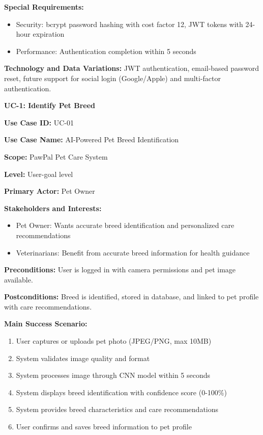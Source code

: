 \textbf{Special Requirements:}
\begin{itemize}
    \item Security: bcrypt password hashing with cost factor 12, JWT tokens with 24-hour expiration
    \item Performance: Authentication completion within 5 seconds
\end{itemize}

\textbf{Technology and Data Variations:} JWT authentication, email-based password reset, future support for social login (Google/Apple) and multi-factor authentication.

\textbf{UC-1: Identify Pet Breed}

\textbf{Use Case ID:} UC-01

\textbf{Use Case Name:} AI-Powered Pet Breed Identification

\textbf{Scope:} PawPal Pet Care System

\textbf{Level:} User-goal level

\textbf{Primary Actor:} Pet Owner

\textbf{Stakeholders and Interests:}
\begin{itemize}
    \item Pet Owner: Wants accurate breed identification and personalized care recommendations
    \item Veterinarians: Benefit from accurate breed information for health guidance
\end{itemize}

\textbf{Preconditions:} User is logged in with camera permissions and pet image available.

\textbf{Postconditions:} Breed is identified, stored in database, and linked to pet profile with care recommendations.

\textbf{Main Success Scenario:}
\begin{enumerate}
    \item User captures or uploads pet photo (JPEG/PNG, max 10MB)
    \item System validates image quality and format
    \item System processes image through CNN model within 5 seconds
    \item System displays breed identification with confidence score (0-100\%)
    \item System provides breed characteristics and care recommendations
    \item User confirms and saves breed information to pet profile
\end{enumerate}

